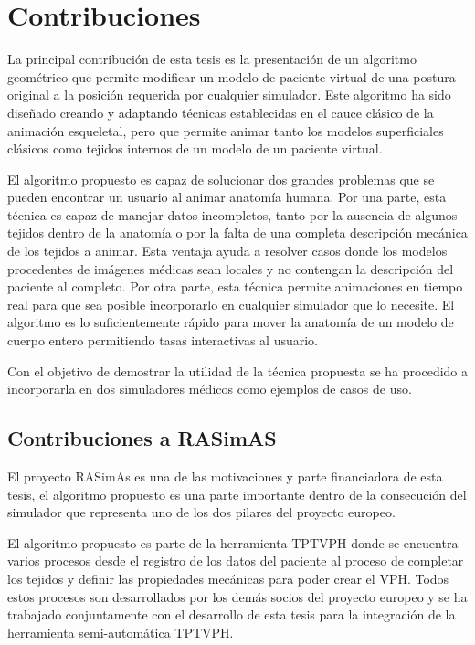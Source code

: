\section{Contribuciones}
\label{intro:contribuciones}

La principal contribución de esta tesis es la presentación de un algoritmo geométrico que permite modificar un modelo de paciente virtual de una postura original a la posición requerida por cualquier simulador. Este algoritmo ha sido diseñado creando y adaptando técnicas establecidas en el cauce clásico de la animación esqueletal, pero que permite animar tanto los modelos superficiales clásicos como tejidos internos de un modelo de un paciente virtual.

El algoritmo propuesto es capaz de solucionar dos grandes problemas que se pueden encontrar un usuario al animar anatomía humana. Por una parte, esta técnica es capaz de manejar datos incompletos, tanto por la ausencia de algunos tejidos dentro de la anatomía o por la falta de una completa descripción mecánica de los tejidos a animar. Esta ventaja ayuda a resolver casos donde los modelos procedentes de imágenes médicas sean locales y no contengan la descripción del paciente al completo. Por otra parte, esta técnica permite animaciones en tiempo real para que sea posible incorporarlo en cualquier simulador que lo necesite. El algoritmo es lo suficientemente rápido para mover la anatomía de un modelo de cuerpo entero permitiendo tasas interactivas al usuario.

Con el objetivo de demostrar la utilidad de la técnica propuesta se ha procedido a incorporarla en dos simuladores médicos como ejemplos de casos de uso. 

\subsection{Contribuciones a RASimAS}
El proyecto \ac{RASimAs} es una de las motivaciones y parte financiadora de esta tesis, el algoritmo propuesto es una parte importante dentro de la consecución del simulador que representa uno de los dos pilares del proyecto europeo.  

El algoritmo propuesto es parte de la herramienta \ac{TPTVPH} donde se encuentra varios procesos desde el registro de los datos del paciente al proceso de completar los tejidos y definir las propiedades mecánicas para poder crear el \ac{VPH}. Todos estos procesos son desarrollados por los demás socios del proyecto europeo y se ha trabajado conjuntamente con el desarrollo de esta tesis para la integración de la herramienta semi-automática \acs{TPTVPH}. 

